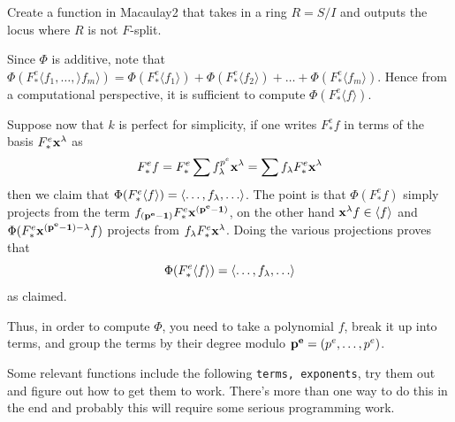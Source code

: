 \documentclass[12pt]{amsart}
\numberwithin{equation}{theorem}
\renewcommand{\:}{\colon}
\begin{document}
\begin{exercise}
Create a function in Macaulay2 that takes in a ring $R = S/I$ and outputs the locus where $R$ is not $F$-split.
\end{exercise}

\begin{remark}
Since $\Phi$ is additive, note that $\Phi(F^e_* \langle f_1, \ldots, \rangle f_m \rangle) = \Phi(F^e_* \langle f_1 \rangle) + \Phi(F^e_* \langle f_2 \rangle) + \dots + \Phi(F^e_* \langle f_m \rangle)$.  Hence from a computational perspective, it is sufficient to compute $\Phi(F^e_* \langle f \rangle)$.

Suppose now that $k$ is perfect for simplicity, if one writes $F^e_* f$ in terms of the basis $F^e_* {\bf x^{\lambda}}$ as
\[
F^e_* f = F^e_* \sum f^{p^e}_{\bf \lambda} {\bf x^{\lambda}} = \sum f_{\bf \lambda} F^e_* {\bf x^{\lambda}}
\]
then we claim that $\Phi(F^e_* \langle f \rangle) = \langle \ldots, f_{\bf \lambda}, \ldots \rangle$.  The point is that $\Phi(F^e_* f)$ simply projects from the term $f_{\bf (p^e-1)} F^e_* {\bf x^{(p^e-1)}}$, on the other hand ${\bf x^{\lambda}} f \in \langle f \rangle$ and $\Phi(F^e_* {\bf x^{(p^e-1) - \lambda}} f )$ projects from $f_{\bf \lambda} F^e_* {\bf x^{\lambda}}$.  Doing the various projections proves that
\[
\Phi(F^e_* \langle f \rangle) = \langle \ldots, f_{\bf \lambda}, \ldots \rangle
\]
as claimed.

Thus, in order to compute $\Phi$, you need to take a polynomial $f$, break it up into terms, and group the terms by their degree modulo ${\bf p^e} = (p^e, \ldots, p^e)$.

Some relevant functions include the following {\tt terms, exponents}, try them out and figure out how to get them to work.  There's more than one way to do this in the end and probably this will require some serious programming work.
\end{remark}
\end{document}
